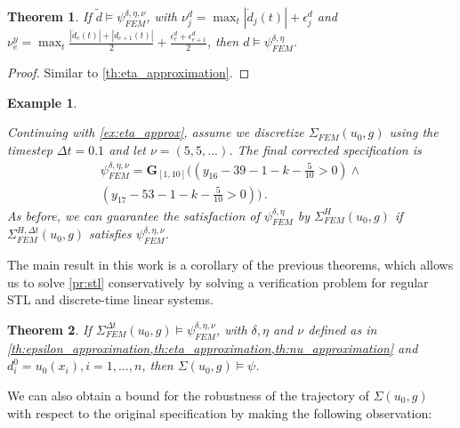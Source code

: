 \documentclass[letterpaper, 10 pt, conference]{ieeeconf/ieeeconf}
\newtheorem{theorem}{Theorem}
\newtheorem{example}{Example}
\newcommand{\Always}{\mathbf{G}}
\begin{document}
\begin{theorem}
    \label{th:nu_approximation}
    If $\tilde d \models \psi^{\delta, \eta, \nu}_{FEM}$, with
    $\nu^d_j = \max_t |\dot d_j(t)| + \epsilon^d_j$ and
    $\nu^y_e = \max_t \frac{|\dot d_e(t)| + |\dot d_{e+1}(t)|}{2} +
    \frac{\epsilon^d_e + \epsilon^d_{e+1}}{2}$, then 
    $d \models \psi^{\delta, \eta}_{FEM}$.
\end{theorem}
\begin{proof}
    Similar to \cref{th:eta_approximation}.
\end{proof}

\begin{example}
    \label{ex:nu_approx}

    Continuing with \cref{ex:eta_approx}, assume we discretize $\Sigma_{FEM}(u_0, g)$ using
    the timestep $\Delta t = 0.1$ and let $\nu = (5, 5, ...)$. The final
    corrected specification is
    \begin{multline}
        \psi^{\delta, \eta, \nu}_{FEM} = \Always_{[1,10]} \bigl(
            (y_{16} - 39 - 1 - k - \frac{5}{10} > 0) \land \\ 
            (y_{17} - 53 - 1 - k - \frac{5}{10} > 0)
        \bigr) \,.
    \end{multline}
    As before, we can guarantee the satisfaction of $\psi^{\delta,
    \eta}_{FEM}$ by $\Sigma^H_{FEM}(u_0, g)$ if $\Sigma_{FEM}^{H, \Delta t}(u_0, g)$ satisfies
    $\psi^{\delta, \eta, \nu}_{FEM}$.
    
\end{example}

The main result in this work is a corollary of the previous theorems, which
allows us to solve \cref{pr:stl}
conservatively by solving a verification problem for regular STL and discrete-time
linear systems. 

\begin{theorem}
    \label{th:main}
    If $\Sigma_{FEM}^{\Delta t}(u_0, g) \models \psi^{\delta, \eta, \nu}_{FEM}$, with $\delta, \eta$
    and $\nu$ defined as in \cref{th:epsilon_approximation,th:eta_approximation,th:nu_approximation}
    and $d^0_i = u_0(x_i), i = 1,...,n$, then $\Sigma(u_0, g) \models \psi$.
\end{theorem}

We can also obtain a bound for the robustness of the
trajectory of $\Sigma(u_0, g)$ with respect to the original specification 
by making the following observation:
\end{document}
